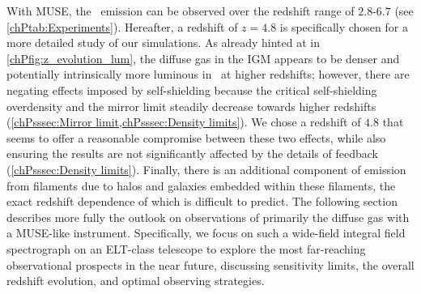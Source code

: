 With MUSE, the \lya\ emission can be observed over the redshift range of $2.8$-$6.7$ (see \cref{chPtab:Experiments}). Hereafter, a redshift of $z=4.8$ is specifically chosen for a more detailed study of our simulations. As already hinted at in \cref{chPfig:z_evolution_lum}, the diffuse gas in the IGM appears to be denser and potentially intrinsically more luminous in \lya\ at higher redshifts; however, there are negating effects imposed by self-shielding because the critical self-shielding overdensity and the mirror limit steadily decrease towards higher redshifts (\cref{chPsssec:Mirror limit,chPsssec:Density limits}). We chose a redshift of $4.8$ that seems to offer a reasonable compromise between these two effects, while also ensuring the results are not significantly affected by the details of feedback (\cref{chPsssec:Density limits}). Finally, there is an additional component of emission from filaments due to halos and galaxies embedded within these filaments, the exact redshift dependence of which is difficult to predict. The following section describes more fully the outlook on observations of primarily the diffuse gas with a MUSE-like instrument. Specifically, we focus on such a wide-field integral field spectrograph on an ELT-class telescope to explore the most far-reaching observational prospects in the near future, discussing sensitivity limits, the overall redshift evolution, and optimal observing strategies.

